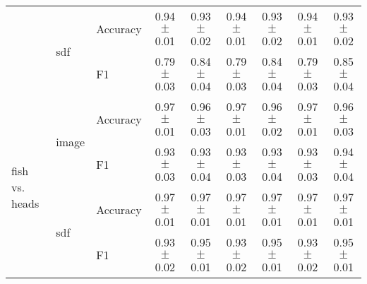\documentclass[anon,11pt]{9520} %
\begin{document}
\begin{table}
\begin{center}
\begin{tabular}{l|l|l|cc|cc|cc|}
& \multirow{2}{*}{sdf} & \multirow{1}{*}{Accuracy}& 0.94$\pm$0.01& 0.93$\pm$0.02& 0.94$\pm$0.01& 0.93$\pm$0.02& 0.94$\pm$0.01& 0.93$\pm$0.02\\ 
& & \multirow{1}{*}{F1}& 0.79$\pm$0.03& 0.84$\pm$0.04& 0.79$\pm$0.03& 0.84$\pm$0.04& 0.79$\pm$0.03& 0.85$\pm$0.04\\ \cline{2-9} 

\multirow{4}{*}{fish vs. heads}
& \multirow{2}{*}{image} & \multirow{1}{*}{Accuracy}& 0.97$\pm$0.01& 0.96$\pm$0.03& 0.97$\pm$0.01& 0.96$\pm$0.02& 0.97$\pm$0.01& 0.96$\pm$0.03\\ 
& & \multirow{1}{*}{F1}& 0.93$\pm$0.03& 0.93$\pm$0.04& 0.93$\pm$0.03& 0.93$\pm$0.04& 0.93$\pm$0.03& 0.94$\pm$0.04\\ \cline{2-9} 

& \multirow{2}{*}{sdf} & \multirow{1}{*}{Accuracy}& 0.97$\pm$0.01& 0.97$\pm$0.01& 0.97$\pm$0.01& 0.97$\pm$0.01& 0.97$\pm$0.01& 0.97$\pm$0.01\\ 
& & \multirow{1}{*}{F1}& 0.93$\pm$0.02& 0.95$\pm$0.01& 0.93$\pm$0.02& 0.95$\pm$0.01& 0.93$\pm$0.02& 0.95$\pm$0.01\\ \cline{2-9} 

\end{tabular}
\end{center}
\end{table}
\end{document}
